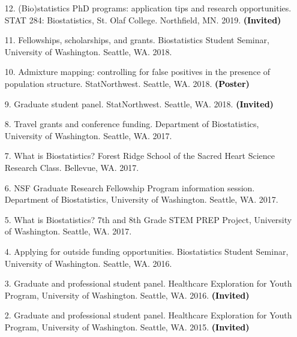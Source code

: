 \documentclass[margin]{res}
\newcommand{\annotate}[1]{\textcolor{black}{\textbf{(#1)}}}
\begin{document}
\begin{resume}
\begin{itemize}
\item[12.] (Bio)statistics PhD programs: application tips and research opportunities. 
STAT 284: Biostatistics, St. Olaf College. Northfield, MN. 2019. 
\annotate{Invited}

\item[11.] Fellowships, scholarships, and grants. 
Biostatistics Student Seminar, University of Washington. Seattle, WA. 2018.

\item[10.] %
Admixture mapping: controlling for false positives in the presence of population structure. 
StatNorthwest. Seattle, WA. 2018. 
\annotate{Poster}%

\item[9.] Graduate student panel. 
StatNorthwest. Seattle, WA. 2018. 
\annotate{Invited}

\item[8.] %
Travel grants and conference funding. 
Department of Biostatistics, University of Washington. Seattle, WA. 2017.

\item[7.] %
What is Biostatistics? 
Forest Ridge School of the Sacred Heart Science Research Class. Bellevue, WA. 2017.

\item[6.] %
NSF Graduate Research Fellowship Program information session. 
Department of Biostatistics, University of Washington. Seattle, WA. 2017.

\item[5.] %
What is Biostatistics? 
7th and 8th Grade STEM PREP Project, University of Washington. Seattle, WA. 2017. %

\item[4.] %
Applying for outside funding opportunities. 
Biostatistics Student Seminar, University of Washington. Seattle, WA. 2016.

\item[3.] Graduate and professional student panel. 
Healthcare Exploration for Youth Program, University of Washington. Seattle, WA. 2016. 
\annotate{Invited}

\item[2.] Graduate and professional student panel. 
Healthcare Exploration for Youth Program, University of Washington. Seattle, WA. 2015. 
\annotate{Invited}


\end{itemize}
\end{resume}
\end{document}
